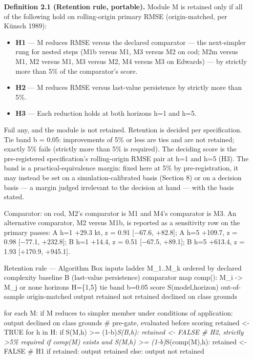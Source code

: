 \documentclass[11pt]{article}
\providecommand{\tightlist}{\setlength{\itemsep}{0.2em}\setlength{\parskip}{0pt}}
\begin{document}
\textbf{Definition 2.1 (Retention rule, portable).} Module M is retained
only if all of the following hold on rolling-origin primary RMSE
(origin-matched, per Künsch 1989):

\begin{itemize}
\tightlist
\item
  \textbf{H1} --- M reduces RMSE versus the declared comparator --- the
  next-simpler rung for nested steps (M1b versus M1, M3 versus M2 on
  cod; M2m versus M1, M2 versus M1, M3 versus M2, M4 versus M3 on
  Edwards) --- by strictly more than 5\% of the comparator's score.
\item
  \textbf{H2} --- M reduces RMSE versus last-value persistence by
  strictly more than 5\%.
\item
  \textbf{H3} --- Each reduction holds at both horizons h=1 and h=5.
\end{itemize}

Fail any, and the module is not retained. Retention is decided per
specification. Tie band b = 0.05: improvements of 5\% or less are ties
and are not retained; exactly 5\% fails (strictly more than 5\% is
required). The deciding score is the pre-registered specification's
rolling-origin RMSE pair at h=1 and h=5 (H3). The band is a
practical-equivalence margin: fixed here at 5\% by pre-registration, it
may instead be set on a simulation-calibrated basis (Section 8) or on a
decision basis --- a margin judged irrelevant to the decision at hand
--- with the basis stated.

Comparator: on cod, M2's comparator is M1 and M4's comparator is M3. An
alternative comparator, M2 versus M1b, is reported as a sensitivity row
on the primary passes: A h=1 +29.3 kt, z = 0.91 {[}−67.6, +82.8{]}; A
h=5 +109.7, z = 0.98 {[}−77.1, +232.8{]}; B h=1 +14.4, z = 0.51
{[}−67.5, +89.1{]}; B h=5 +613.4, z = 1.93 {[}+170.9, +945.1{]}.

Retention rule --- Algorithm Box inputs ladder M\_1..M\_k ordered by
declared complexity baseline B (last-value persistence) comparator map
comp(): M\_i -\textgreater{} M\_j or none horizons H=\{1,5\} tie band
b=0.05 score S(model,horizon) out-of-sample origin-matched output
retained \textbar{} not retained \textbar{} declined on class grounds

for each M: if M reduces to simpler member under conditions of
application: output declined on class grounds \# pre-gate, evaluated
before scoring retained \textless- TRUE for h in H: if S(M,h)
\textgreater= (1-b)\emph{S(B,h): retained \textless- FALSE \# H2,
strictly \textgreater5\% required if comp(M) exists and S(M,h)
\textgreater= (1-b)}S(comp(M),h): retained \textless- FALSE \# H1 if
retained: output retained else: output not retained
\end{document}
